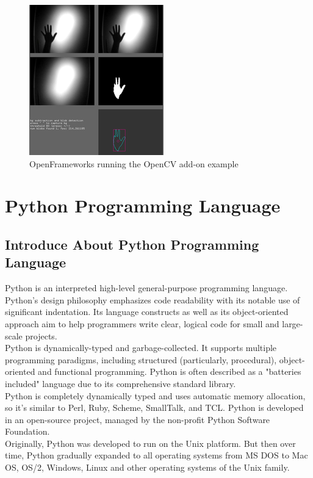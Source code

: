         \begin{figure}[H]
            \centering
            \includegraphics[width=0.6\linewidth]{img/openframework.png}
            \caption{OpenFrameworks running the OpenCV add-on example}
        \end{figure}

\section{Python Programming Language}
    \subsection{Introduce About Python Programming Language}
        Python is an interpreted high-level general-purpose programming language. Python's design philosophy emphasizes code readability 
        with its notable use of significant indentation. Its language constructs as well as its object-oriented approach aim to help programmers 
        write clear, logical code for small and large-scale projects. \\
        \vspace{3mm}
        Python is dynamically-typed and garbage-collected. It supports multiple programming paradigms, including structured (particularly, procedural), 
        object-oriented and functional programming. Python is often described as a "batteries included" language due to its comprehensive standard library. \\
        \vspace{3mm}
        Python is completely dynamically typed and uses automatic memory allocation, so it's similar to Perl, Ruby, Scheme, SmallTalk, and TCL. Python is 
        developed in an open-source project, managed by the non-profit Python Software Foundation. \\
        \vspace{3mm}
        Originally, Python was developed to run on the Unix platform. But then over time, Python gradually expanded to all operating systems from MS DOS to 
        Mac OS, OS/2, Windows, Linux and other operating systems of the Unix family.
